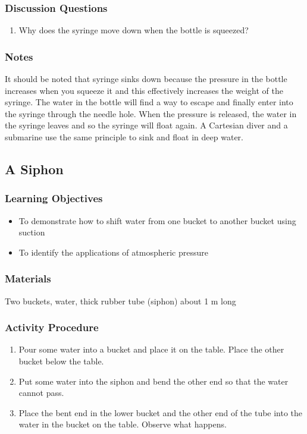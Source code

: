 \subsubsection*{Discussion Questions}
\begin{enumerate}
\item{Why does the syringe move down when the bottle is squeezed?}
\end{enumerate}

\subsubsection*{Notes}
It should be noted that syringe sinks down because the pressure in the bottle increases when you squeeze it and this effectively increases the weight of the syringe. The water in the bottle will find a way to escape and finally enter into the syringe through the needle hole. When the pressure is released, the water in the syringe leaves and so the syringe will float again. A Cartesian diver and a submarine use the same principle to sink and float in deep water.


\subsection{A Siphon}

\subsubsection*{Learning Objectives}
\begin{itemize}
\item{To demonstrate how to shift water from one bucket to another bucket using suction} 
\item{To identify the applications of atmospheric pressure} 
\end{itemize}

\subsubsection*{Materials}
Two buckets, water, thick rubber tube (siphon) about 1 m long

\subsubsection*{Activity Procedure}
\begin{enumerate}
\item{Pour some water into a bucket and place it on the table. Place the other bucket below the table.} 
\item{Put some water into the siphon and bend the other end so that the water cannot pass.} 
\item{Place the bent end in the lower bucket and the other end of the tube into the water in the bucket on the table. Observe what happens.} 
\end{enumerate}

